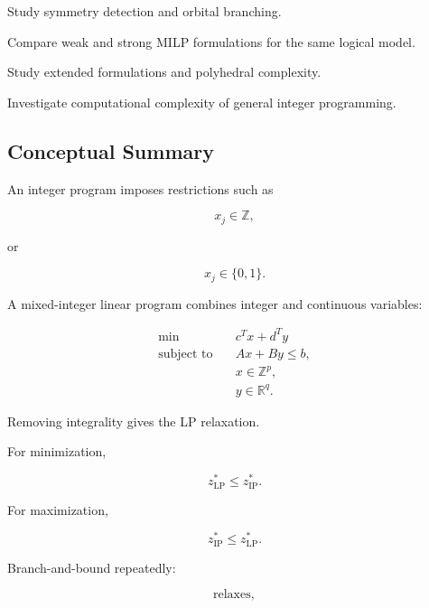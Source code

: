 \begin{exercise}[4]
Study symmetry detection and orbital branching.
\end{exercise}

\begin{exercise}[4]
Compare weak and strong MILP formulations for the same logical model.
\end{exercise}

\begin{exercise}[4]
Study extended formulations and polyhedral complexity.
\end{exercise}

\begin{exercise}[4]
Investigate computational complexity of general integer programming.
\end{exercise}

\subsection{Conceptual Summary}
\label{subsec:integer-programming-summary}

An integer program imposes restrictions such as

\[
\boxed{
x_j\in\mathbb{Z},
}
\]

or

\[
\boxed{
x_j\in\{0,1\}.
}
\]

A mixed-integer linear program combines integer and continuous variables:

\[
\boxed{
\begin{aligned}
\min
\quad&
c^Tx+d^Ty
\\
\text{subject to}
\quad&
Ax+By\leq b,
\\
&
x\in\mathbb{Z}^p,
\\
&
y\in\mathbb{R}^q.
\end{aligned}
}
\]

Removing integrality gives the LP relaxation.

For minimization,

\[
\boxed{
z_{\mathrm{LP}}^*
\leq
z_{\mathrm{IP}}^*.
}
\]

For maximization,

\[
\boxed{
z_{\mathrm{IP}}^*
\leq
z_{\mathrm{LP}}^*.
}
\]

Branch-and-bound repeatedly:

\[
\boxed{
\text{relaxes},
}
\]

